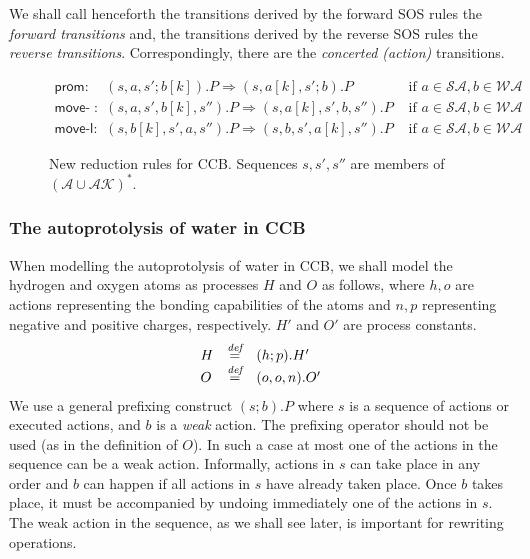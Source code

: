 \documentclass[runningheads]{llncs}
\newcommand{\bydef}{\stackrel{\emph{def}}{=}}
\newcommand{\rulename}[1]{\textsf{#1}}
\begin{document}
We shall call henceforth the transitions derived by the forward SOS rules the \emph{forward transitions} 
and, the transitions derived by the reverse SOS rules the \emph{reverse transitions}.
Correspondingly, there are the \emph{concerted (action)} transitions. 

\begin{figure}
\[
\begin{array}{lll}
\rulename{prom}: & (s,a,s';b[k]).P \Rightarrow (s,a[k],s';b).P & \mbox{ if } a \in \mathcal{SA}, b \in \mathcal{WA} 
\\[10pt]
\rulename{move-r}: & (s,a,s',b[k],s'').P \Rightarrow (s,a[k],s',b,s'').P & \mbox{ if } a \in \mathcal{SA}, b \in \mathcal{WA}
\\[10pt]
\rulename{move-l}: & (s,b[k],s',a,s'').P \Rightarrow (s,b,s',a[k],s'').P & \mbox{ if } a \in \mathcal{SA}, b \in \mathcal{WA}
\end{array}
\] 
\caption[Reduction rules for CCB.]{New reduction rules for CCB. Sequences $s, s', s''$ are members of $(\mathcal{A} \cup \mathcal{AK})^{*}$.} 
\label{fig:reduction}
\end{figure}



%
%

\subsubsection{The autoprotolysis of water in CCB}

When modelling the autoprotolysis of water in CCB, we shall model the hydrogen and oxygen atoms as processes $H$ and $O$ as follows, where 
$h,o$ are actions representing the bonding capabilities of the atoms and $n,p$ 
representing negative and positive charges, respectively. $H'$ and $O'$ are process constants.
$$\begin{array}{lll}
H & \bydef & (h;p).H'\\
O & \bydef & (o,o,n).O'
\end{array}$$
We use a general prefixing construct $(s;b).P$ where $s$ is a sequence of actions or executed 
actions, and $b$ is a \emph{weak} action. The prefixing operator should not be used (as in the definition of $O$). In such a case at most one of the actions in the sequence can be a weak action. Informally, actions in $s$ can take place in any order 
and $b$ can happen if
all actions in $s$ have already taken place. Once $b$ takes place, it must be accompanied by
undoing immediately one of the actions in $s$. The weak action in the sequence, as we shall see later, is important for rewriting operations.  
\end{document}
